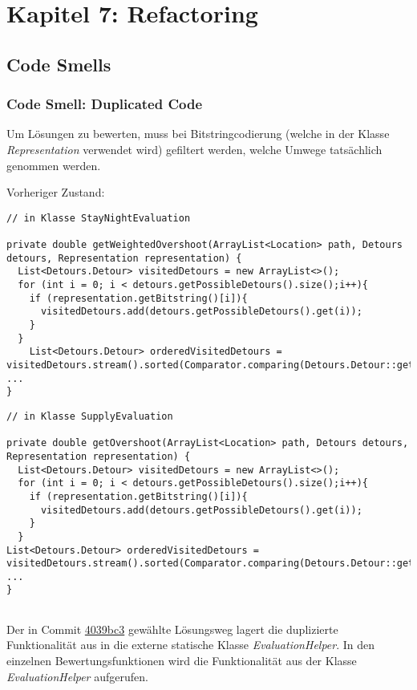 \section{Kapitel 7: Refactoring}

\subsection{Code Smells}

\subsubsection{Code Smell: Duplicated Code}

Um Lösungen zu bewerten, muss bei Bitstringcodierung (welche in der Klasse \textit{Representation} verwendet wird) gefiltert werden, welche Umwege tatsächlich genommen werden.

Vorheriger Zustand:

\begin{lstlisting}
// in Klasse StayNightEvaluation 

private double getWeightedOvershoot(ArrayList<Location> path, Detours detours, Representation representation) {
  List<Detours.Detour> visitedDetours = new ArrayList<>();
  for (int i = 0; i < detours.getPossibleDetours().size();i++){
    if (representation.getBitstring()[i]){
      visitedDetours.add(detours.getPossibleDetours().get(i));
    }
  }
    List<Detours.Detour> orderedVisitedDetours = visitedDetours.stream().sorted(Comparator.comparing(Detours.Detour::getPosition)).toList();
...
}

\end{lstlisting}

\begin{lstlisting}
// in Klasse SupplyEvaluation 
	
private double getOvershoot(ArrayList<Location> path, Detours detours, Representation representation) {
  List<Detours.Detour> visitedDetours = new ArrayList<>();
  for (int i = 0; i < detours.getPossibleDetours().size();i++){
    if (representation.getBitstring()[i]){
      visitedDetours.add(detours.getPossibleDetours().get(i));
    }
  }
List<Detours.Detour> orderedVisitedDetours = visitedDetours.stream().sorted(Comparator.comparing(Detours.Detour::getPosition)).toList();
...	
}
	
\end{lstlisting}

Der in Commit \href{commit https://github.com/reichert-p/GPXrechner/commit/4039bc31f6310508875c59ed44b6b227f2f0510d}{4039bc3} gewählte Lösungsweg lagert die duplizierte Funktionalität aus in die externe statische Klasse \textit{EvaluationHelper}. In den einzelnen Bewertungsfunktionen wird die Funktionalität aus der Klasse \textit{EvaluationHelper} aufgerufen.

